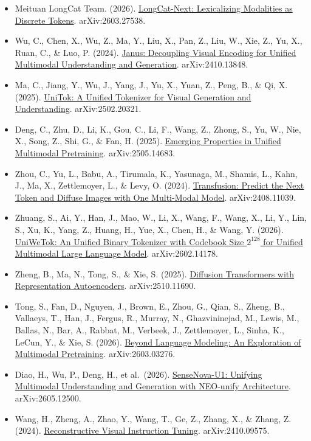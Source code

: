 \vspace{0.25em}
\begin{itemize}
\tightlist
\item
  Meituan LongCat Team. (2026). \href{https://arxiv.org/abs/2603.27538}{LongCat-Next: Lexicalizing Modalities as Discrete Tokens}. arXiv:2603.27538.
\item
  Wu, C., Chen, X., Wu, Z., Ma, Y., Liu, X., Pan, Z., Liu, W., Xie, Z., Yu, X., Ruan, C., \& Luo, P. (2024). \href{https://arxiv.org/abs/2410.13848}{Janus: Decoupling Visual Encoding for Unified Multimodal Understanding and Generation}. arXiv:2410.13848.
\item
  Ma, C., Jiang, Y., Wu, J., Yang, J., Yu, X., Yuan, Z., Peng, B., \& Qi, X. (2025). \href{https://arxiv.org/abs/2502.20321}{UniTok: A Unified Tokenizer for Visual Generation and Understanding}. arXiv:2502.20321.
\item
  Deng, C., Zhu, D., Li, K., Gou, C., Li, F., Wang, Z., Zhong, S., Yu, W., Nie, X., Song, Z., Shi, G., \& Fan, H. (2025). \href{https://arxiv.org/abs/2505.14683}{Emerging Properties in Unified Multimodal Pretraining}. arXiv:2505.14683.
\item
  Zhou, C., Yu, L., Babu, A., Tirumala, K., Yasunaga, M., Shamis, L., Kahn, J., Ma, X., Zettlemoyer, L., \& Levy, O. (2024). \href{https://arxiv.org/abs/2408.11039}{Transfusion: Predict the Next Token and Diffuse Images with One Multi-Modal Model}. arXiv:2408.11039.
\item
  Zhuang, S., Ai, Y., Han, J., Mao, W., Li, X., Wang, F., Wang, X., Li, Y., Lin, S., Xu, K., Yang, Z., Huang, H., Yue, X., Chen, H., \& Wang, Y. (2026). \href{https://arxiv.org/abs/2602.14178}{UniWeTok: An Unified Binary Tokenizer with Codebook Size \(2^{128}\) for Unified Multimodal Large Language Model}. arXiv:2602.14178.
\item
  Zheng, B., Ma, N., Tong, S., \& Xie, S. (2025). \href{https://arxiv.org/abs/2510.11690}{Diffusion Transformers with Representation Autoencoders}. arXiv:2510.11690.
\item
  Tong, S., Fan, D., Nguyen, J., Brown, E., Zhou, G., Qian, S., Zheng, B., Vallaeys, T., Han, J., Fergus, R., Murray, N., Ghazvininejad, M., Lewis, M., Ballas, N., Bar, A., Rabbat, M., Verbeek, J., Zettlemoyer, L., Sinha, K., LeCun, Y., \& Xie, S. (2026). \href{https://arxiv.org/abs/2603.03276}{Beyond Language Modeling: An Exploration of Multimodal Pretraining}. arXiv:2603.03276.
\item
  Diao, H., Wu, P., Deng, H., et al.~(2026). \href{https://arxiv.org/abs/2605.12500}{SenseNova-U1: Unifying Multimodal Understanding and Generation with NEO-unify Architecture}. arXiv:2605.12500.
\item
  Wang, H., Zheng, A., Zhao, Y., Wang, T., Ge, Z., Zhang, X., \& Zhang, Z. (2024). \href{https://arxiv.org/abs/2410.09575}{Reconstructive Visual Instruction Tuning}. arXiv:2410.09575.
\end{itemize}

\clearpage
